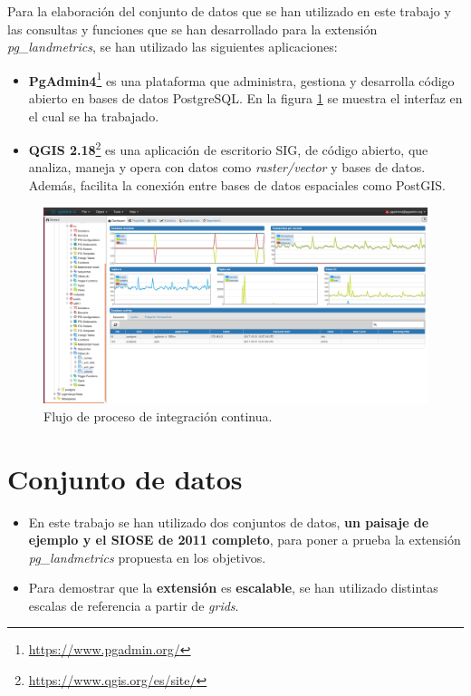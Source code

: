 Para la elaboración del conjunto de datos que se han utilizado en este trabajo y las consultas y funciones que se han desarrollado para la extensión \textit{pg\_landmetrics}, se han utilizado las siguientes aplicaciones:

\begin{itemize}
\item\textbf{PgAdmin4}\footnote{\url{https://www.pgadmin.org/}} es una plataforma que administra, gestiona y desarrolla código abierto en bases de datos PostgreSQL. En la figura \ref{fig:carga} se muestra el interfaz en el cual se ha trabajado.
\item\textbf{QGIS 2.18}\footnote{\url{https://www.qgis.org/es/site/}} es una aplicación de escritorio SIG, de código abierto, que analiza, maneja y opera con datos como \textit{raster/vector} y bases de datos. Además, facilita la conexión entre bases de datos espaciales como PostGIS.
\end{itemize}

\begin{figure}
\begin{center}
\includegraphics[width=\textwidth]{Metodologia/Figs/carga-siose-2011.png}
\caption{Flujo de proceso de integración continua. \label{fig:carga}}
\end{center}
\end{figure}


\section{Conjunto de datos}

\begin{graybox}
\begin{itemize}
\item En este trabajo se han utilizado dos conjuntos de datos, \textbf{un paisaje de ejemplo y el SIOSE de 2011 completo}, para poner a prueba la extensión \textit{pg\_landmetrics} propuesta en los objetivos.
\item Para demostrar que la \textbf{extensión} es \textbf{escalable}, se han utilizado distintas escalas de referencia a partir de \textit{grids}.
\end{itemize}
\end{graybox}

